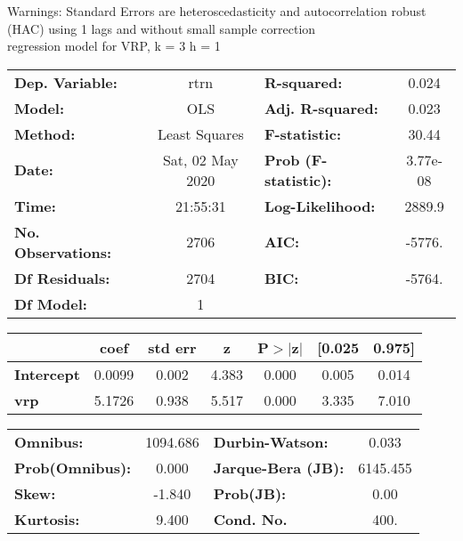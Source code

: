 Warnings: \newline
 [1] Standard Errors are heteroscedasticity and autocorrelation robust (HAC) using 1 lags and without small sample correction\\ 

regression model for VRP, k = 3 h = 1\begin{center}
\begin{tabular}{lclc}
\toprule
\textbf{Dep. Variable:}    &       rtrn       & \textbf{  R-squared:         } &     0.024   \\
\textbf{Model:}            &       OLS        & \textbf{  Adj. R-squared:    } &     0.023   \\
\textbf{Method:}           &  Least Squares   & \textbf{  F-statistic:       } &     30.44   \\
\textbf{Date:}             & Sat, 02 May 2020 & \textbf{  Prob (F-statistic):} &  3.77e-08   \\
\textbf{Time:}             &     21:55:31     & \textbf{  Log-Likelihood:    } &    2889.9   \\
\textbf{No. Observations:} &        2706      & \textbf{  AIC:               } &    -5776.   \\
\textbf{Df Residuals:}     &        2704      & \textbf{  BIC:               } &    -5764.   \\
\textbf{Df Model:}         &           1      & \textbf{                     } &             \\
\bottomrule
\end{tabular}
\begin{tabular}{lcccccc}
                   & \textbf{coef} & \textbf{std err} & \textbf{z} & \textbf{P$> |$z$|$} & \textbf{[0.025} & \textbf{0.975]}  \\
\midrule
\textbf{Intercept} &       0.0099  &        0.002     &     4.383  &         0.000        &        0.005    &        0.014     \\
\textbf{vrp}       &       5.1726  &        0.938     &     5.517  &         0.000        &        3.335    &        7.010     \\
\bottomrule
\end{tabular}
\begin{tabular}{lclc}
\textbf{Omnibus:}       & 1094.686 & \textbf{  Durbin-Watson:     } &    0.033  \\
\textbf{Prob(Omnibus):} &   0.000  & \textbf{  Jarque-Bera (JB):  } & 6145.455  \\
\textbf{Skew:}          &  -1.840  & \textbf{  Prob(JB):          } &     0.00  \\
\textbf{Kurtosis:}      &   9.400  & \textbf{  Cond. No.          } &     400.  \\
\bottomrule
\end{tabular}
\end{center}

